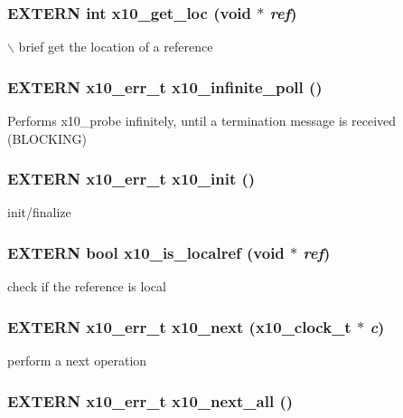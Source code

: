 \subsubsection{\setlength{\rightskip}{0pt plus 5cm}EXTERN int x10\_\-get\_\-loc (void $\ast$ {\em ref})}\label{x10_8h_a20}


$\backslash$ brief get the location of a reference 
\subsubsection{\setlength{\rightskip}{0pt plus 5cm}EXTERN {\bf x10\_\-err\_\-t} x10\_\-infinite\_\-poll ()}\label{x10_8h_a7}


Performs x10\_\-probe infinitely, until a termination message is received (BLOCKING) 
\subsubsection{\setlength{\rightskip}{0pt plus 5cm}EXTERN {\bf x10\_\-err\_\-t} x10\_\-init ()}\label{x10_8h_a2}


init/finalize 

\subsubsection{\setlength{\rightskip}{0pt plus 5cm}EXTERN bool x10\_\-is\_\-localref (void $\ast$ {\em ref})}\label{x10_8h_a21}


check if the reference is local 

\subsubsection{\setlength{\rightskip}{0pt plus 5cm}EXTERN {\bf x10\_\-err\_\-t} x10\_\-next ({\bf x10\_\-clock\_\-t} $\ast$ {\em c})}\label{x10_8h_a16}


perform a next operation 

\subsubsection{\setlength{\rightskip}{0pt plus 5cm}EXTERN {\bf x10\_\-err\_\-t} x10\_\-next\_\-all ()}\label{x10_8h_a17}


